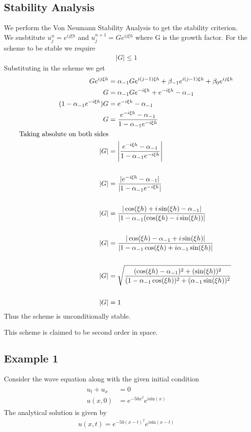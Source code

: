 \subsection{Stability Analysis}
We perform the Von Neumann Stability Analysis to get the stability criterion.
We susbtitute $u_{j}^{n}=e^{ij\xi h}$ and $u_{j}^{n+1} = G e^{ij\xi h}$ where G is the growth factor.
For the scheme to be stable we require
\begin{align*}
 |G| \leq 1
\end{align*}
Substituting in the scheme we get
\begin{align*}
 G e^{ij\xi h} &= \alpha_{-1}G e^{i(j-1)\xi h}+\beta_{-1} e^{i(j-1)\xi h}+\beta_{0} e^{ij\xi h}\\
 G &= \alpha_{-1}G e^{-i \xi h}+ e^{-i \xi h}-\alpha_{-1} \\
 (1-\alpha_{-1} e^{-i \xi h})G &= e^{-i \xi h}-\alpha_{-1}\\
 G &= \frac{e^{-i \xi h}-\alpha_{-1}}{1-\alpha_{-1} e^{-i \xi h}}\\ 
 \text{Taking absolute on both sides}\\
 |G| &= \Bigg{\lvert} \frac{e^{-i \xi h}-\alpha_{-1}}{1-\alpha_{-1} e^{-i \xi h}} \Bigg{\rvert}\\ \\
 |G| &= \frac{|e^{-i \xi h}-\alpha_{-1}|}{|1-\alpha_{-1} e^{-i \xi h}|}\\ \\
 |G| &= \frac{|\cos(\xi h) + i\sin(\xi h)-\alpha_{-1}|}{|1-\alpha_{-1} (\cos(\xi h) - i\sin(\xi h))|}\\ \\
 |G| &= \frac{|\cos(\xi h)-\alpha_{-1} + i\sin(\xi h)|}{|1-\alpha_{-1}\cos(\xi h) + i\alpha_{-1}\sin(\xi h)|}\\ \\
 |G| &= \sqrt{\frac{(\cos(\xi h)-\alpha_{-1})^2 + (\sin(\xi h))^2}{(1-\alpha_{-1}\cos(\xi h))^2 + (\alpha_{-1}\sin(\xi h))^2}}\\ \\
 |G| &= 1
\end{align*}
Thus the scheme is unconditionally stable.

This scheme is claimed to be second order in space.

\subsection{Example 1}
Consider the wave equation along with the given initial condition
\begin{align}
 \begin{split}
  u_{t} + u_{x} &= 0\\
   u(x,0) &= e^{-50x^2}e^{i\text{sin}(x)}
 \end{split} 
\end{align}
The analytical solution is given by
\begin{align}
 u(x,t) = e^{-50(x-t)^2}e^{i\text{sin}(x-t)}
\end{align}


